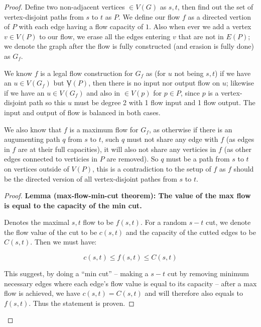 \documentclass[11pt]{article}
\begin{document}
\begin{proof}

Define two non-adjacent vertices $\in V(G)$ as $s, t$, then find out the set of vertex-disjoint paths from $s$ to $t$ as $P$. We define our flow $f$ as a directed vertion of $P$ with each edge having a flow capacity of $1$. Also when ever we add a vertex $v \in V(P)$ to our flow, we erase all the edges entering $v$ that are not in $E(P)$; we denote the graph after the flow is fully constructed (and erasion is fully done) as $G_f$.

We know $f$ is a legal flow construction for $G_f$ as (for $u$ not being $s, t$) if we have an $u \in V(G_f)$ but $\not V(P)$, then there is no input nor output flow on $u$; likewise if we have an $u \in V(G_f)$ and also in $\in V(p)$ for $p \in P$, since $p$ is a vertex-disjoint path so this $u$ must be degree 2 with 1 flow input and 1 flow output. The input and output of flow is balanced in both cases.

We also know that $f$ is a maximum flow for $G_f$, as otherwise if there is an augumenting path $q$ from $s$ to $t$, such $q$ must not share any edge with $f$ (as edges in $f$ are at their full capacities), it will also not share any verticies in $f$ (as other edges connected to verticies in $P$ are removed). So $q$ must be a path from $s$ to $t$ on vertices outside of $V(P)$, this is a contradiction to the setup of $f$ as $f$ should be the directed version of all vertex-disjoint pathes from $s$ to $t$.




\leavevmode\newline


    \begin{adjustwidth}{1cm}{}

    \begin{proof}
    \textbf{Lemma (max-flow-min-cut theorem):  The value of the max flow is equal to the capacity of the min cut.}\newline

    Denotes the maximal $s, t$ flow to be $f(s, t)$. For a random $s-t$ cut, we denote the flow value of the cut to be $c(s, t)$ and the capacity of the cutted edges to be $C(s, t)$. Then we must have:

    \begin{equation}
        c(s, t) \leq f(s, t) \leq C(s, t)
    \end{equation}

    This suggest, by doing a ``min cut'' -- making a $s-t$ cut by removing minimum necessary edges where each edge's flow value is equal to its capacity -- after a max flow is achieved, we have $c(s, t) = C(s, t)$ and will therefore also equals to $f(s, t)$. Thus the statement is proven.


    \end{proof}

    \end{adjustwidth}

\end{proof}
\end{document}
